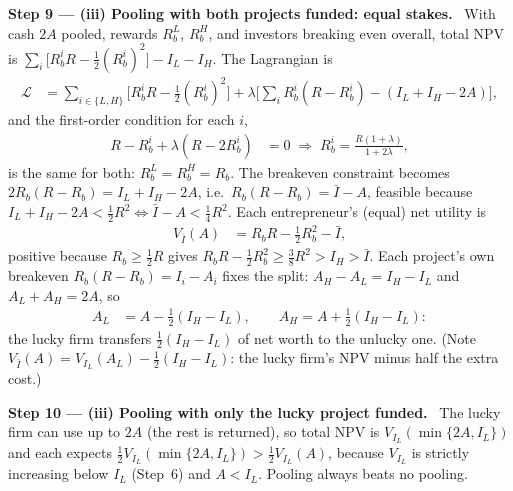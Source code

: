\documentclass[11pt,a4paper]{article}
\newcommand{\step}[2]{\par\medskip\noindent\textbf{Step #1 --- #2.}~}
\begin{document}
\step{9}{(iii) Pooling with both projects funded: equal stakes} With cash $2A$ pooled, rewards
$R_b^L$, $R_b^H$, and investors breaking even overall, total NPV is
$\sum_i\big[R_b^iR-\tfrac12(R_b^i)^2\big]-I_L-I_H$. The Lagrangian is
\begin{align}
  \mathcal L &= \sum_{i\in\{L,H\}}\Big[R_b^iR-\tfrac12(R_b^i)^2\Big]
     +\lambda\Big[\sum_iR_b^i(R-R_b^i)-(I_L+I_H-2A)\Big], \nonumber
\end{align}
and the first-order condition for each $i$,
\begin{align}
  R-R_b^i+\lambda(R-2R_b^i) &= 0 \;\Rightarrow\; R_b^i=\frac{R(1+\lambda)}{1+2\lambda}, \nonumber
\end{align}
is the same for both: $R_b^L=R_b^H=R_b$. The breakeven constraint becomes
$2R_b(R-R_b)=I_L+I_H-2A$, i.e.\ $R_b(R-R_b)=\bar I-A$, feasible because
$I_L+I_H-2A<\tfrac12R^2\iff\bar I-A<\tfrac14R^2$. Each entrepreneur's (equal) net utility is
\begin{align}
  V_{\bar I}(A) &= R_bR-\tfrac12R_b^2-\bar I, \label{r4e14-both}
\end{align}
positive because $R_b\ge\tfrac12R$ gives $R_bR-\tfrac12R_b^2\ge\tfrac38R^2>I_H>\bar I$. Each project's
own breakeven $R_b(R-R_b)=I_i-A_i$ fixes the split: $A_H-A_L=I_H-I_L$ and $A_L+A_H=2A$, so
\begin{align}
  A_L &= A-\tfrac12(I_H-I_L), \qquad A_H=A+\tfrac12(I_H-I_L): \nonumber
\end{align}
the lucky firm transfers $\tfrac12(I_H-I_L)$ of net worth to the unlucky one. (Note
$V_{\bar I}(A)=V_{I_L}(A_L)-\tfrac12(I_H-I_L)$: the lucky firm's NPV minus half the extra cost.)

\step{10}{(iii) Pooling with only the lucky project funded} The lucky firm can use up to $2A$
(the rest is returned), so total NPV is $V_{I_L}(\min\{2A,I_L\})$ and each expects
$\tfrac12V_{I_L}(\min\{2A,I_L\})>\tfrac12V_{I_L}(A)$, because $V_{I_L}$ is strictly increasing
below $I_L$ (Step~6) and $A<I_L$. Pooling always beats no pooling.
\end{document}
